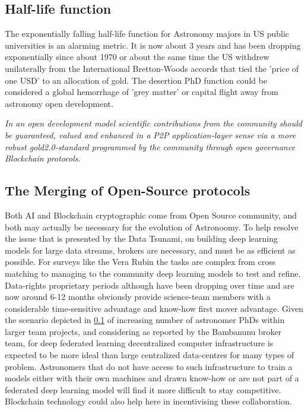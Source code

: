 \documentclass[final,5p,times,twocolumn,authoryear]{elsarticle}
\begin{document}
\subsection{Half-life function}
\label{btc2:sec:sub:half}

The exponentially falling half-life function for Astronomy majors in US public universities is an alarming metric. It is now about 3 years and has been dropping exponentially since about 1970 or about the same time the US withdrew unilaterally from the International Bretton-Woods accords that tied the 'price of one USD' to an allocation of gold. The desertion PhD function could be considered a global hemorrhage of 'grey matter' or capital flight away from astronomy open development.

\emph{In an open development model scientific contributions from the community should be guaranteed, valued and enhanced in a P2P application-layer sense via a more robust gold2.0-standard programmed by the community through open governance Blockchain protocols.}


\subsection{The Merging of Open-Source protocols}

Both AI and Blockchain cryptographic come from Open Source community, and both may actually be necessary for the evolution of Astronoomy. To help resolve the issue that is presented by the Data Tsunami, on building deep learning models for large data streams, brokers are necessary, and must be as efficient as possible. For surveys like the Vera Rubin the tasks are complex from cross matching to managing to the community deep learning models to test and refine. Data-rights proprietary periods although have been dropping over time and are now around 6-12 months obviously provide science-team members with a considerable time-sensitive advantage and know-how first mover advantage.  Given the scenario depicted in \ref{btc2:sec:sub:half} of increasing number of astronomer PhDs within larger team projects, and considering as reported by the Bambanunu broker team, for deep federated learning decentralized computer infrastructure is expected to be more ideal than large centralized data-centres for many types of problem.  Astronomers that do not have access to such infrastructure to train a models either with their own machines and drawn know-how or are not part of a federated deep learning model will find it more difficult to stay competitive. Blockchain technology could also help here in incentivising these collaboration.   
\end{document}
